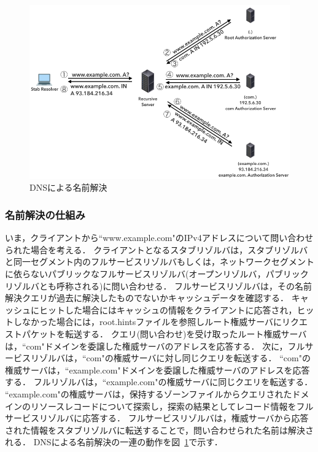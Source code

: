 \begin{figure}[h]
 \centering
 \includegraphics[width=12.0cm]{figure/dns-name-resolution.png}
 \caption{DNSによる名前解決}
 \label{fig:dns-name-resolution}
\end{figure}

\subsubsection{名前解決の仕組み}
いま，クライアントから``www.example.com"のIPv4アドレスについて問い合わせられた場合を考える．
クライアントとなるスタブリゾルバは，スタブリゾルバと同一セグメント内のフルサービスリゾルバもしくは，ネットワークセグメントに依らないパブリックなフルサービスリゾルバ(オープンリゾルバ，パブリックリゾルバとも呼称される)に問い合わせる．
フルサービスリゾルバは，その名前解決クエリが過去に解決したものでないかキャッシュデータを確認する．
キャッシュにヒットした場合にはキャッシュの情報をクライアントに応答され，ヒットしなかった場合には，root.hintsファイルを参照しルート権威サーバにリクエストパケットを転送する．
クエリ(問い合わせ)を受け取ったルート権威サーバは，``com"ドメインを委譲した権威サーバのアドレスを応答する．
次に，フルサービスリゾルバは，``com"の権威サーバに対し同じクエリを転送する．
``com"の権威サーバは，``example.com"ドメインを委譲した権威サーバのアドレスを応答する．
フルリゾルバは，``example.com"の権威サーバに同じクエリを転送する．
``example.com"の権威サーバは，保持するゾーンファイルからクエリされたドメインのリソースレコードについて探索し，探索の結果としてレコード情報をフルサービスリゾルバに応答する．
フルサービスリゾルバは，権威サーバから応答された情報をスタブリゾルバに転送することで，問い合わせられた名前は解決される．
DNSによる名前解決の一連の動作を図~\ref{fig:dns-name-resolution}で示す．



